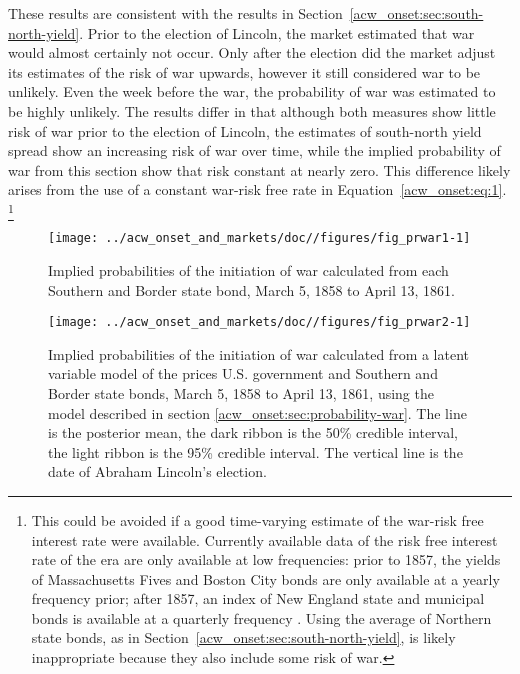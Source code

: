 These results are consistent with the results in Section~\ref{acw_onset:sec:south-north-yield}.
Prior to the election of Lincoln, the market estimated that war would almost certainly not occur.
Only after the election did the market adjust its estimates of the risk of war upwards, however it still considered war to be unlikely.
Even the week before the war, the probability of war was estimated to be highly unlikely.
The results differ in that although both measures show little risk of war prior to the election of Lincoln, the estimates of south-north yield spread show an increasing risk of war over time, while the implied probability of war from this section show that risk constant at nearly zero.
This difference likely arises from the use of a constant war-risk free rate in Equation~\eqref{acw_onset:eq:1}.%
\footnote{
  This could be avoided if a good time-varying estimate of the war-risk free interest rate were available.
  Currently available data of the risk free interest rate of the era are only available at low frequencies: prior to 1857, the yields of Massachusetts Fives and Boston City bonds are only available at a yearly frequency prior; after 1857, an index of New England state and municipal bonds is available at a quarterly frequency \parencite{Officer2003}.
  Using the average of Northern state bonds, as in Section~\ref{acw_onset:sec:south-north-yield}, is likely inappropriate because they also include some risk of war.
}

\begin{figure}
  \centering
  \texttt{[image: ../acw\_onset\_and\_markets/doc//figures/fig\_prwar1-1]}
  \caption{Implied probabilities of the initiation of war calculated from each Southern and Border state bond, March  5, 1858 to April 13, 1861.}
  \label{acw_onset:fig:prwar1}
\end{figure}

\begin{figure}
  \centering
  \texttt{[image: ../acw\_onset\_and\_markets/doc//figures/fig\_prwar2-1]}
  \caption[Implied probabilities of the initiation of war calculated from a latent variable model of the prices U.S. government and Southern and border state bonds, March  5, 1858 to April 13, 1861, using the model described in section \ref{acw_onset:sec:probability-war}]{
    Implied probabilities of the initiation of war calculated from a latent variable model of the prices U.S. government and Southern and Border state bonds, March  5, 1858 to April 13, 1861, using the model described in section \ref{acw_onset:sec:probability-war}.
    The line is the posterior mean, the dark ribbon is the 50\% credible interval, the light ribbon is the 95\% credible interval.
    The vertical line is the date of Abraham Lincoln's election.
  }
  \label{acw_onset:fig:prwar2}
\end{figure}

